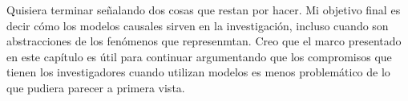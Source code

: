 Quisiera terminar señalando dos cosas que restan por hacer. 
Mi objetivo final es decir cómo los modelos causales sirven en la investigación, incluso cuando son abstracciones de los fenómenos que represenmtan.
Creo que el marco presentado en este capítulo es útil para continuar argumentando que los compromisos que tienen los investigadores cuando utilizan modelos es menos problemático de lo que pudiera parecer a primera vista.

